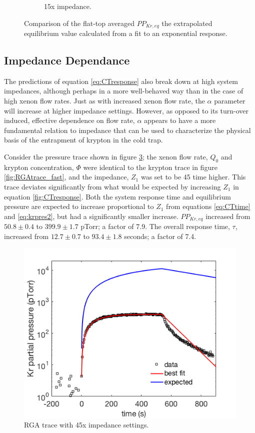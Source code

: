 \documentclass[12pt]{article}
\begin{document}
\begin{figure}[h!]
\begin{subfigure}{0.5\textwidth}
  \caption{15x impedance.}
  \label{fig:flowresponse_15x}
\end{subfigure}
\caption{Comparison of the flat-top averaged $PP_{Kr,eq}$ the extrapolated equilibrium value calculated from a fit to an exponential response.} 
\label{fig:flowresponse}
\end{figure}



\subsection{Impedance Dependance}
\label{sec:impedance_real}
The predictions of equation \ref{eq:CTresponse} also break down at high system impedances, although perhaps in a more well-behaved way than in the case of high xenon flow rates. Just as with increased xenon flow rate, the $\alpha$ parameter will increase at higher impedance settings. However, as opposed to its turn-over induced, effective dependence on flow rate, $\alpha$ appears to have a more fundamental relation to impedance that can be used to characterize the physical basis of the entrapment of krypton in the cold trap.

Consider the pressure trace shown in figure \ref{fig:RGAtrace_slow}; the xenon flow rate, $Q_0$ and krypton concentration, $\Phi$ were identical to the krypton trace in figure \ref{fig:RGAtrace_fast}, and the impedance, $Z_1$ was set to be 45 time higher. This trace deviates significantly from what would be expected by increasing $Z_1$ in equation \ref{fig:CTresponse}. Both the system response time and equilibrium pressure are expected to increase proportional to $Z_1$ from equations \ref{eq:CTtime} and \ref{eq:krpres2}, but had a significantly smaller increase. $PP_{Kr,eq}$ increased from $50.8 \pm 0.4$ to $399.9\pm 1.7$ pTorr; a factor of 7.9. The overall response time, $\tau$, increased from $12.7 \pm 0.7$ to $93.4 \pm 1.8$ seconds; a factor of 7.4. 
\begin{figure}[h!]
\centering
\includegraphics[width=\textwidth]{Figures/RGAtrace_fit_slow_wexp.png}
\caption{RGA trace with 45x impedance settings. }
\label{fig:RGAtrace_slow}
\end{figure}
\end{document}
